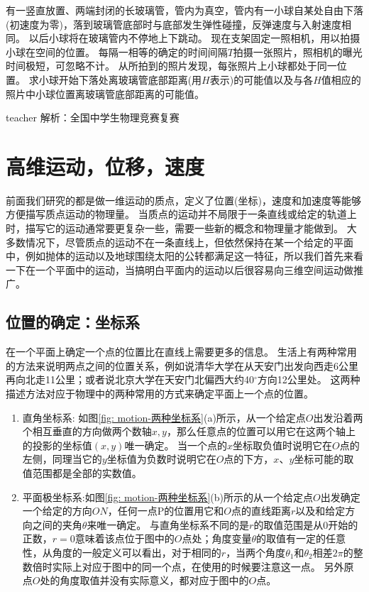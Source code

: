 \begin{example}
有一竖直放置、两端封闭的长玻璃管，管内为真空，管内有一小球自某处自由下落(初速度为零)，落到玻璃管底部时与底部发生弹性碰撞，反弹速度与入射速度相同。
以后小球将在玻璃管内不停地上下跳动。
现在支架固定一照相机，用以拍摄小球在空间的位置。
每隔一相等的确定的时间间隔$T$拍摄一张照片，照相机的曝光时间极短，可忽略不计。
从所拍到的照片发现，每张照片上小球都处于同一位置。
求小球开始下落处离玻璃管底部距离(用$H$表示)的可能值以及与各$H$值相应的照片中小球位置离玻璃管底部距离的可能值。
\begin{taggedblock}{teacher}
\newline
解析：全国中学生物理竞赛复赛
\end{taggedblock}
\end{example}



\section{高维运动，位移，速度}
前面我们研究的都是做一维运动的质点，定义了位置(坐标)，速度和加速度等能够方便描写质点运动的物理量。
当质点的运动并不局限于一条直线或给定的轨道上时，描写它的运动通常要更复杂一些，需要一些新的概念和物理量才能做到。
大多数情况下，尽管质点的运动不在一条直线上，但依然保持在某一个给定的平面中，例如抛体的运动以及地球围绕太阳的公转都满足这一特征，所以我们首先来看一下在一个平面中的运动，当搞明白平面内的运动以后很容易向三维空间运动做推广。
\subsection{位置的确定：坐标系}
在一个平面上确定一个点的位置比在直线上需要更多的信息。
生活上有两种常用的方法来说明两点之间的位置关系，例如说清华大学在从天安门出发向西走6公里再向北走11公里；或者说北京大学在天安门北偏西大约40$^\circ$方向12公里处。
这两种描述方法对应于物理中的两种常用的方式来确定平面上一个点的位置。
\begin{enumerate}
\item 直角坐标系:  如图\ref{fig: motion-两种坐标系}(a)所示，从一个给定点$O$出发沿着两个相互垂直的方向做两个数轴$x,y$，那么任意点的位置可以用它在这两个轴上的投影的坐标值$(x,y)$唯一确定。
当一个点的$x$坐标取负值时说明它在$O$点的左侧，同理当它的$y$坐标值为负数时说明它在$O$点的下方，$x、y$坐标可能的取值范围都是全部的实数值。
\item 平面极坐标系:如图\ref{fig: motion-两种坐标系}(b)所示的从一个给定点$O$出发确定一个给定的方向$ON$，任何一点P的位置用它和$O$点的直线距离$r$以及和给定方向之间的夹角$\theta$来唯一确定。
与直角坐标系不同的是$r$的取值范围是从0开始的正数，$r=0$意味着该点位于图中的$O$点处；角度变量$\theta$的取值有一定的任意性，从角度的一般定义可以看出，对于相同的$r$，当两个角度$\theta_1$和$\theta_2$相差$2\pi$的整数倍时实际上对应于图中的同一个点，在使用的时候要注意这一点。
另外原点$O$处的角度取值并没有实际意义，都对应于图中的$O$点。
\end{enumerate}




